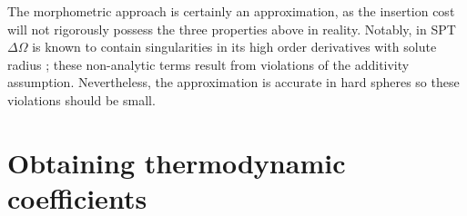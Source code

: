 \documentclass[11pt,twoside]{report}
\begin{document}
The morphometric approach is certainly an approximation, as the insertion cost will not rigorously possess the three properties above in reality.
Notably, in SPT $\Delta\Omega$ is known to contain singularities in its high order derivatives with solute radius \cite{ReissJCP1959}; these non-analytic terms result from violations of the additivity assumption.
Nevertheless, the approximation is accurate in hard spheres \cite{OettelEL2009,AshtonPRE2011,LairdPRE2012,BlokhuisPRE2013,UrrutiaPRE2014,Hansen-GoosJCP2014} so these violations should be small.



\section{Obtaining thermodynamic coefficients}
\label{sec:spt}
\end{document}
